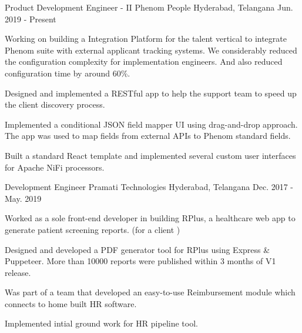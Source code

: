 

\begin{cventries}

  \cventry
  {Product Development Engineer - II} %
  {Phenom People} %
  {Hyderabad, Telangana} %
  {Jun. 2019 - Present} %
  {
    \begin{cvitems} %
      \item {Working on building a Integration Platform for the talent vertical to integrate Phenom suite with external applicant tracking systems. We considerably reduced the configuration complexity for implementation engineers. And also reduced configuration time by around 60\%.}
      \item {Designed and implemented a RESTful app to help the support team to speed up the client discovery process.}
      \item {Implemented a conditional JSON field mapper UI using drag-and-drop approach. The app was used to map fields from external APIs to Phenom standard fields.}
      \item {Built a standard React template and implemented several custom user interfaces for Apache NiFi processors.}
    \end{cvitems}
  }

  \cventry
  {Development Engineer} %
  {Pramati Technologies} %
  {Hyderabad, Telangana} %
  {Dec. 2017 - May. 2019} %
  {
    \begin{cvitems} %
      \item {Worked as a sole front-end developer in building RPlus, a healthcare web app to generate patient screening reports. (for a client )}
      \item {Designed and developed a PDF generator tool for RPlus using Express \& Puppeteer. More than 10000 reports were published within 3 months of V1 release.}
      \item {Was part of a team that developed an easy-to-use Reimbursement module which connects to home built HR software.}
      \item {Implemented intial ground work for HR pipeline tool.}
    \end{cvitems}
  }


\end{cventries}
